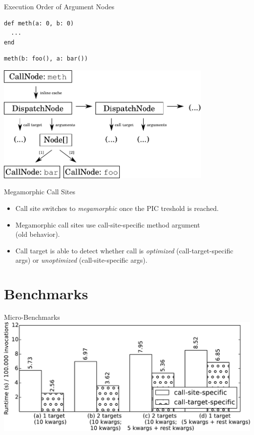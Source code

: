 \documentclass[xcolor=dvipsname]{beamer} %
\begin{document}
\begin{frame}[fragile]{Execution Order of Argument Nodes}
\begin{minipage}{0.45\textwidth}
\begin{lstlisting}
def meth(a: 0, b: 0)
  ...
end
\end{lstlisting}
\end{minipage} %
\begin{minipage}{0.5\textwidth}
\begin{lstlisting}
meth(b: foo(), a: bar())
\end{lstlisting}
\end{minipage}

\begin{table}
\centering
\includegraphics[width=0.8\textwidth]{ast_nodes.pdf}
\end{table}
\end{frame}

\begin{frame}{Megamorphic Call Sites}
\begin{itemize}
	\item Call site switches to \emph{megamorphic} once the PIC treshold is reached.
	\item Megamorphic call sites use call-site-specific method argument \\ (old behavior).
	\item Call target is able to detect whether call is \emph{optimized} (call-target-specific args) or \emph{unoptimized} (call-site-specific args).
\end{itemize}
\end{frame}

\section{Benchmarks}
\begin{frame}{Micro-Benchmarks}
	\centering
	\includegraphics[width=\textwidth]{benchmark.pdf}
\end{frame}
\end{document}

